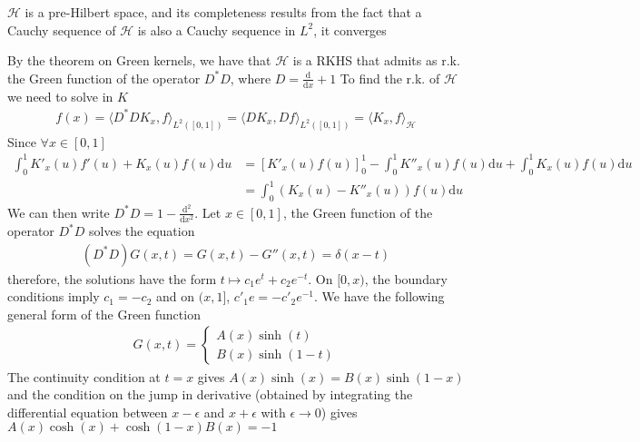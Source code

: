 \documentclass[10pt]{article}
\begin{document}
    $\mathcal{H}$ is a pre-Hilbert space, and its completeness
    results from the fact that a Cauchy sequence of $\mathcal{H}$ is also a 
    Cauchy sequence in $L^2$, it converges 
    
    By the theorem on Green kernels, we have that $\mathcal{H}$
    is a RKHS that admits as r.k. the Green function of the operator $D^*D$, 
    where $D = \frac{\text{d}}{\text{d}x} + 1$
    To find the r.k. of $\mathcal{H}$ we need to solve in $K$
    \begin{align*}
        f(x) = \langle D^*DK_x, f\rangle_{L^2([0, 1])} = \langle DK_x, 
        Df\rangle_{L^2([0, 1])} = \langle K_x, f\rangle_{\mathcal{H}}
    \end{align*}
    Since $\forall x \in [0, 1]$
    \begin{align*}
        \int_0^1 K'_x(u)f'(u) + K_x(u)f(u)\text{d}u& = \left[K'_x(u)f(u)
        \right]^1_0 - \int_0^1K''_x(u)f(u)\text{d}u + 
        \int_0^1K_x(u)f(u)\text{d}u\\& = \int_0^1 (K_x(u) - K''_x(u))f(u)
        \text{d}u
    \end{align*}
    We can then write $D^*D = 1 - \frac{\text{d}^2}{\text{d}x^2}$. Let $x
    \in[0, 1]$, the Green function of the operator $D^*D$ solves the equation 
    \begin{align*}
        (D^*D) G(x, t) = G(x, t) - G''(x, t)  = \delta(x-t)
    \end{align*} therefore, the solutions have the form $t\mapsto 
    c_1 e^t + c_2 e^{-t}$. On $[0, x)$, the boundary conditions imply $c_1 = 
    -c_2$ and on $(x, 1]$, $c'_1e = -c'_2e^{-1}$. We have the following general 
    form of the Green function
    \begin{align*}
        G(x, t) = \begin{cases}
            A(x)\sinh(t)\\
            B(x)\sinh(1 - t)
        \end{cases}
    \end{align*}
    The continuity condition at $t=x$ gives $A(x)\sinh(x) = B(x)\sinh(1-x)$ and 
    the condition on the jump in derivative (obtained by 
    integrating the differential equation between $x-\epsilon$ and
     $x+\epsilon$ with $\epsilon \rightarrow 0$) gives $  A(x) \cosh(x) + 
     \cosh(1-x)B(x) = -1$
\end{document}
